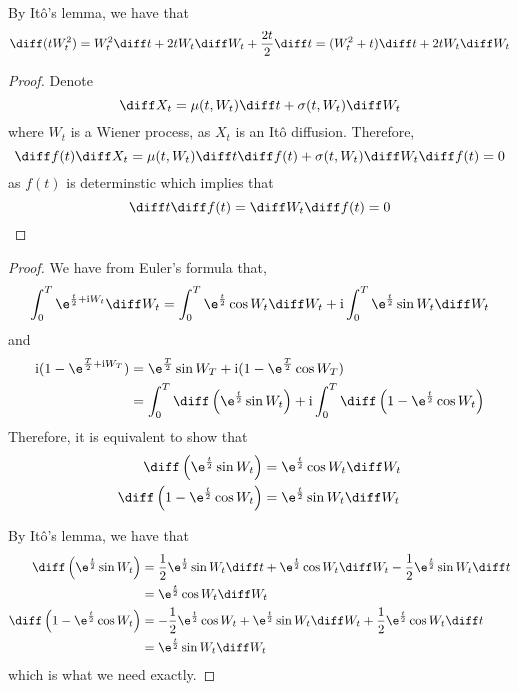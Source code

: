     \problem
    By It\^o's lemma, we have that
    \[\diff (tW_t^2)=W_t^2\diff t+2tW_t\diff W_t+\frac{2t}{2}\diff t
    =(W_t^2+t)\diff t+2tW_t\diff W_t\]

    \problem
    \begin{proof}
        Denote
        \[\diff X_t=\mu(t,W_t)\diff t+\sigma(t,W_t)\diff W_t\]
        where $W_t$ is a Wiener process, as $X_t$ is an It\^o diffusion.
        Therefore,
        \[\diff f(t)\diff X_t=\mu(t,W_t)\diff t\diff f(t)
        +\sigma(t,W_t)\diff W_t\diff f(t)=0\]
        as $f(t)$ is determinstic which implies that
        \[\diff t\diff f(t)=\diff W_t\diff f(t)=0\]
    \end{proof}

    \problem
    \newcommand{\img}{\mathrm i}
    \begin{proof}
        We have from Euler's formula that,
        \[\begin{aligned}
            \int_0^T\e^{\frac{t}{2}+\img W_t}\diff W_t
            =\int_0^T\e^{\frac{t}{2}}\cos W_t\diff W_t
            +\img\int_0^T\e^{\frac{t}{2}}\sin W_t\diff W_t
        \end{aligned}\]
        and
        \[\begin{aligned}
            \img(1-\e^{\frac{T}{2}+\img W_T})
        &=\e^{\frac{T}{2}}\sin W_T+\img(1-\e^{\frac{T}{2}}\cos W_T)\\
        &=\int_0^T\diff\left(\e^{\frac{t}{2}}\sin W_t\right)
        +\img\int_0^T\diff\left(1-\e^{\frac{t}{2}}\cos W_t\right)
        \end{aligned}\]
        Therefore, it is equivalent to show that
        \[\begin{aligned}
            \diff\left(\e^{\frac{t}{2}}\sin W_t\right)
            &=\e^{\frac{t}{2}}\cos W_t\diff W_t\\
            \diff\left(1-\e^{\frac{t}{2}}\cos W_t\right)
            &=\e^{\frac{t}{2}}\sin W_t\diff W_t
        \end{aligned}\]

        By It\^o's lemma, we have that
        \[\begin{aligned}
            \diff\left(\e^{\frac{t}{2}}\sin W_t\right)
            &=\frac{1}{2}\e^{\frac{t}{2}}\sin W_t\diff t
            +\e^{\frac{t}{2}}\cos W_t\diff W_t
            -\frac{1}{2}\e^{\frac{t}{2}}\sin W_t\diff t\\
            &=\e^{\frac{t}{2}}\cos W_t\diff W_t\\
            \diff\left(1-\e^{\frac{t}{2}}\cos W_t\right)
            &=-\frac{1}{2}\e^{\frac{t}{2}}\cos W_t
            +\e^{\frac{t}{2}}\sin W_t\diff W_t
            +\frac{1}{2}\e^{\frac{t}{2}}\cos W_t\diff t\\
            &=\e^{\frac{t}{2}}\sin W_t\diff W_t
        \end{aligned}\]
        which is what we need exactly.
    \end{proof}

